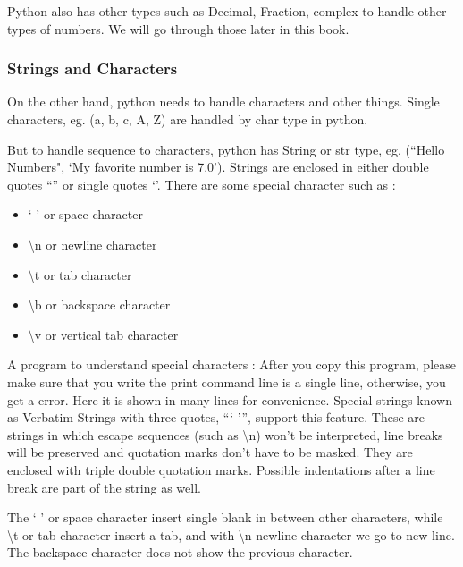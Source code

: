 Python also has other types such as {\color{cyan} Decimal}, {\color{cyan} Fraction}, {\color{cyan} complex}
to handle other types of numbers. We will go through those later in this book.

\subsubsection{Strings and Characters}

On the other hand, python needs to handle characters and other things. Single characters, eg. (a, b, c, A, Z) are handled
by {\color{cyan} char} type in python.

But to handle sequence to characters, python has String or {\color{cyan} str} type, eg. (``Hello Numbers", `My favorite number is 7.0'). Strings are enclosed in either
double quotes ``'' or single quotes `'. There are some special character such as :

\begin{itemize}
\item ` ' or space character
\item \textbackslash n or newline character
\item \textbackslash t or tab character
\item \textbackslash b or backspace character
\item \textbackslash v or vertical tab character
\end{itemize}

A program to understand special characters :
After you copy this program, please make sure that you write the print command line is a single line, otherwise, you get a error. Here it is shown in many lines for convenience.
Special strings known as {\color{cyan} Verbatim Strings} with three quotes, ``` ''', support this feature.  These are strings in which escape sequences (such as \textbackslash n) won't be interpreted, line breaks will be preserved and quotation marks don't have to be masked. They are enclosed with triple double quotation marks. Possible indentations after a line break are part of the string as well.


The ` ' or space character insert single blank in between other characters, while \textbackslash t or tab character insert a tab, and with \textbackslash n newline character
we go to new line. The backspace character does not show the previous character.


